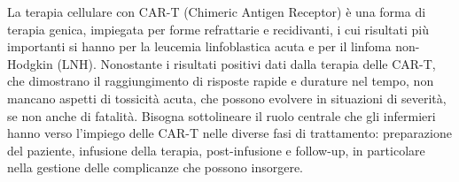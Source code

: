 La terapia cellulare con CAR-T (Chimeric Antigen Receptor) è una forma di terapia genica, impiegata
per forme refrattarie e recidivanti, i cui risultati più importanti si hanno per la leucemia linfoblastica
acuta e per il linfoma non-Hodgkin (LNH).
Nonostante i risultati positivi dati dalla terapia delle CAR-T, che dimostrano il raggiungimento di
risposte rapide e durature nel tempo, non mancano aspetti di tossicità acuta, che possono evolvere
in situazioni di severità, se non anche di fatalità. Bisogna sottolineare il ruolo centrale che gli infermieri hanno 
verso l’impiego delle CAR-T nelle diverse fasi di trattamento: preparazione del paziente, infusione della terapia, 
post-infusione e follow-up, in particolare nella gestione delle complicanze che possono insorgere. 


